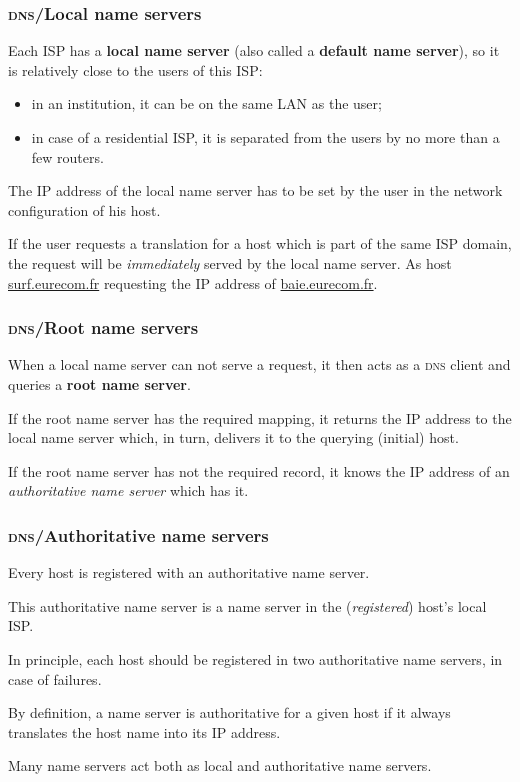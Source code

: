 %
\begin{frame}
\frametitle{\textsc{dns}/Local name servers}

Each ISP has a \textbf{local name server} (also called a
\textbf{default name server}), so it is relatively close to the users
of this ISP:
\begin{itemize}

  \item in an institution, it can be on the same LAN as the user;

  \item in case of a residential ISP, it is separated from the users
  by no more than a few routers.

\end{itemize}

The IP address of the local name server has to be set by the user in
the network configuration of his host.

If the user requests a translation for a host which is part of the
same ISP domain, the request will be \emph{immediately} served by the
local name server. As host \url{surf.eurecom.fr} requesting the IP
address of \url{baie.eurecom.fr}.

\end{frame}

%
\begin{frame}
\frametitle{\textsc{dns}/Root name servers}

When a local name server can not serve a request, it then acts as a
\textsc{dns} client and queries a \textbf{root name server}.

If the root name server has the required mapping, it returns the IP
address to the local name server which, in turn, delivers it to the
querying (initial) host.

If the root name server has not the required record, it knows the IP
address of an \emph{authoritative name server} which has it.

\end{frame}

%
\begin{frame}
\frametitle{\textsc{dns}/Authoritative name
  servers}

Every host is registered with an authoritative name server.

This authoritative name server is a name server in the
(\emph{registered}) host's local ISP. 

In principle, each host should be registered in two authoritative name
servers, in case of failures.

By definition, a name server is authoritative for a given host if it
always translates the host name into its IP address.

Many name servers act both as local and authoritative name servers.

\end{frame}

